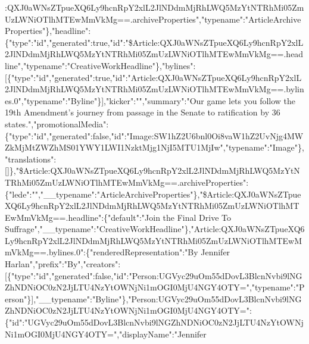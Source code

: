 :QXJ0aWNsZTpueXQ6Ly9hcnRpY2xlL2JlNDdmMjRhLWQ5MzYtNTRhMi05ZmUzLWNiOTlhMTEwMmVkMg==.archiveProperties","typename":"ArticleArchiveProperties"\},"headline":\{"type":"id","generated":true,"id":"\$Article:QXJ0aWNsZTpueXQ6Ly9hcnRpY2xlL2JlNDdmMjRhLWQ5MzYtNTRhMi05ZmUzLWNiOTlhMTEwMmVkMg==.headline","typename":"CreativeWorkHeadline"\},"bylines":{[}\{"type":"id","generated":true,"id":"Article:QXJ0aWNsZTpueXQ6Ly9hcnRpY2xlL2JlNDdmMjRhLWQ5MzYtNTRhMi05ZmUzLWNiOTlhMTEwMmVkMg==.bylines.0","typename":"Byline"\}{]},"kicker":"","summary":"Our
game lets you follow the 19th Amendment's journey from passage in the
Senate to ratification by 36
states.","promotionalMedia":\{"type":"id","generated":false,"id":"Image:SW1hZ2U6bnl0Oi8vaW1hZ2UvNjg4MWZkMjMtZWZhMS01YWY1LWI1NzktMjg1NjI5MTU1MjIw","typename":"Image"\},"translations":{[}{]}\},"\$Article:QXJ0aWNsZTpueXQ6Ly9hcnRpY2xlL2JlNDdmMjRhLWQ5MzYtNTRhMi05ZmUzLWNiOTlhMTEwMmVkMg==.archiveProperties":\{"lede":"","\_\_typename":"ArticleArchiveProperties"\},"\$Article:QXJ0aWNsZTpueXQ6Ly9hcnRpY2xlL2JlNDdmMjRhLWQ5MzYtNTRhMi05ZmUzLWNiOTlhMTEwMmVkMg==.headline":\{"default":"Join
the Final Drive To
Suffrage","\_\_typename":"CreativeWorkHeadline"\},"Article:QXJ0aWNsZTpueXQ6Ly9hcnRpY2xlL2JlNDdmMjRhLWQ5MzYtNTRhMi05ZmUzLWNiOTlhMTEwMmVkMg==.bylines.0":\{"renderedRepresentation":"By
Jennifer
Harlan","prefix":"By","creators":{[}\{"type":"id","generated":false,"id":"Person:UGVyc29uOm55dDovL3BlcnNvbi9lNGZhNDNiOC0zN2JjLTU4NzYtOWNjNi1mOGI0MjU4NGY4OTY=","typename":"Person"\}{]},"\_\_typename":"Byline"\},"Person:UGVyc29uOm55dDovL3BlcnNvbi9lNGZhNDNiOC0zN2JjLTU4NzYtOWNjNi1mOGI0MjU4NGY4OTY=":\{"id":"UGVyc29uOm55dDovL3BlcnNvbi9lNGZhNDNiOC0zN2JjLTU4NzYtOWNjNi1mOGI0MjU4NGY4OTY=","displayName":"Jennifer
